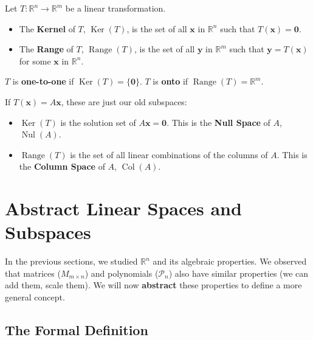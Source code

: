 \documentclass[oneside]{book}
\begin{document}
\begin{definition}
Let $T: \mathbb{R}^n \to \mathbb{R}^m$ be a linear transformation.
\begin{itemize}
    \item The \textbf{Kernel} of $T$, $\operatorname{Ker}(T)$, is the set of all $\mathbf{x}$ in $\mathbb{R}^n$ such that $T(\mathbf{x}) = \mathbf{0}$.
    \item The \textbf{Range} of $T$, $\operatorname{Range}(T)$, is the set of all $\mathbf{y}$ in $\mathbb{R}^m$ such that $\mathbf{y} = T(\mathbf{x})$ for some $\mathbf{x}$ in $\mathbb{R}^n$.
\end{itemize}
$T$ is \textbf{one-to-one} if $\operatorname{Ker}(T) = \{\mathbf{0}\}$.
$T$ is \textbf{onto} if $\operatorname{Range}(T) = \mathbb{R}^m$.
\end{definition}
If $T(\mathbf{x}) = A\mathbf{x}$, these are just our old subspaces:
\begin{itemize}
    \item $\operatorname{Ker}(T)$ is the solution set of $A\mathbf{x} = \mathbf{0}$. This is the \textbf{Null Space} of $A$, $\operatorname{Nul}(A)$.
    \item $\operatorname{Range}(T)$ is the set of all linear combinations of the columns of $A$. This is the \textbf{Column Space} of $A$, $\operatorname{Col}(A)$.
\end{itemize}

\section{Abstract Linear Spaces and Subspaces}
In the previous sections, we studied $\mathbb{R}^n$ and its algebraic properties. We observed that matrices ($M_{m \times n}$) and polynomials ($\mathcal{P}_n$) also have similar properties (we can add them, scale them). We will now \textbf{abstract} these properties to define a more general concept.

\subsection{The Formal Definition}
\end{document}
